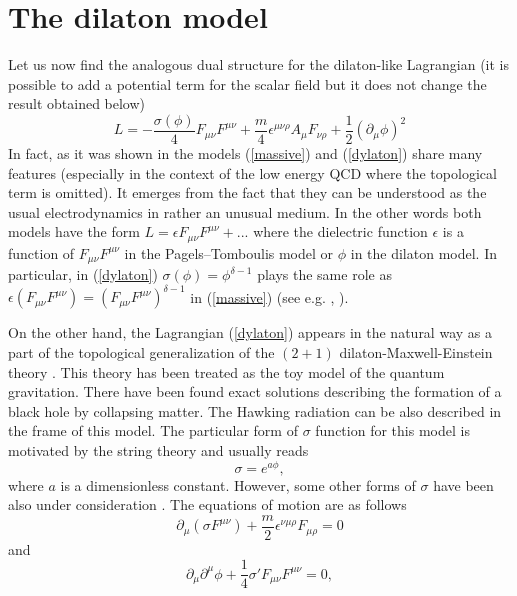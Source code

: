 \documentclass[a4 paper, 12 pt] {article}
\begin{document}
\section{\bf{The dilaton model}}
Let us now find the analogous dual structure for the dilaton-like
Lagrangian (it is possible to add a potential term for the scalar
field but it does not change the result obtained below)
\begin{equation}
L=-\frac{\sigma (\phi )}{4} F_{\mu \nu } F^{\mu \nu } +\frac{m}{4}
\epsilon^{\mu \nu \rho } A_{\mu } F_{\nu \rho} +\frac{1}{2}
(\partial_{\mu } \phi )^2
\label{dylaton}
\end{equation}
In fact, as it was shown in \cite{Pagels} the models
(\ref{massive}) and (\ref{dylaton}) share many features
(especially in the context of the low energy QCD where the
topological term is omitted). It emerges from the fact that they
can be understood as the usual electrodynamics in rather an
unusual medium. In the other words both models have the form $L=
\epsilon F_{\mu \nu}F^{\mu \nu}+...$ where the dielectric function
$\epsilon $ is a function of $ F_{\mu \nu}F^{\mu \nu}$ in the
Pagels--Tomboulis model or $\phi $ in the dilaton model. In
particular, in (\ref{dylaton}) $\sigma( \phi)=\phi^{\delta -1}$
plays the same role as $\epsilon (F_{\mu \nu }F^{\mu \nu })=
(F_{\mu \nu }F^{\mu \nu })^{\delta -1} $ in (\ref{massive}) (see
e.g. \cite{My1}, \cite{My2}).
\par
On the other hand, the Lagrangian (\ref{dylaton}) appears in the
natural way as a part of the topological generalization of the
$(2+1)$ dilaton-Maxwell-Einstein theory \cite{dilaton}. This
theory has been treated as the toy model of the quantum
gravitation. There have been found exact solutions describing the
formation of a black hole by collapsing matter. The Hawking
radiation can be also described in the frame of this model. The
particular form of $\sigma $ function for this model is
motivated by the string theory and usually reads
$$\sigma = e^{a \phi }, $$ where $a$ is a dimensionless constant.
However, some other forms of $\sigma $ have been also under
consideration \cite{dilatoninne}.
\newline
The equations of motion are as follows
\begin{equation}
\partial_{\mu } (\sigma  F^{\mu \nu }) +\frac{m}{2} \epsilon^{\nu \mu \rho}
F_{\mu \rho}=0
\label{eqmot3}
\end{equation}
and
\begin{equation}
\partial_{\mu } \partial^{\mu } \phi + \frac{1}{4} \sigma' F_{\mu \nu } F^{\mu \nu
}=0,
\label{eqmot4}
\end{equation}
\end{document}
